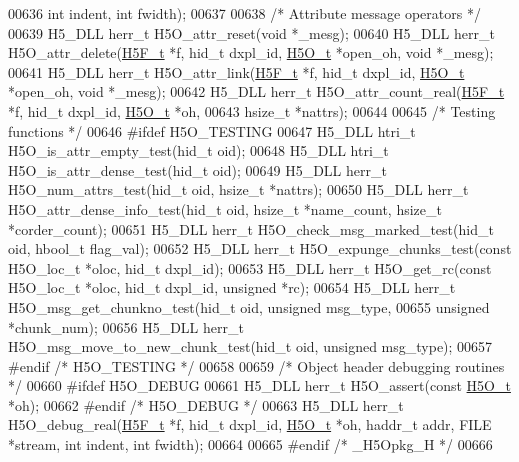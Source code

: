 \begin{DoxyCode}
00636     \textcolor{keywordtype}{int} indent, \textcolor{keywordtype}{int} fwidth);
00637 
00638 \textcolor{comment}{/* Attribute message operators */}
00639 H5\_DLL herr\_t H5O\_attr\_reset(\textcolor{keywordtype}{void} *\_mesg);
00640 H5\_DLL herr\_t H5O\_attr\_delete(\hyperlink{struct_h5_f__t}{H5F\_t} *f, hid\_t dxpl\_id, \hyperlink{struct_h5_o__t}{H5O\_t} *open\_oh, \textcolor{keywordtype}{void} *\_mesg);
00641 H5\_DLL herr\_t H5O\_attr\_link(\hyperlink{struct_h5_f__t}{H5F\_t} *f, hid\_t dxpl\_id, \hyperlink{struct_h5_o__t}{H5O\_t} *open\_oh, \textcolor{keywordtype}{void} *\_mesg);
00642 H5\_DLL herr\_t H5O\_attr\_count\_real(\hyperlink{struct_h5_f__t}{H5F\_t} *f, hid\_t dxpl\_id, \hyperlink{struct_h5_o__t}{H5O\_t} *oh,
00643     hsize\_t *nattrs);
00644 
00645 \textcolor{comment}{/* Testing functions */}
00646 \textcolor{preprocessor}{#ifdef H5O\_TESTING}
00647 H5\_DLL htri\_t H5O\_is\_attr\_empty\_test(hid\_t oid);
00648 H5\_DLL htri\_t H5O\_is\_attr\_dense\_test(hid\_t oid);
00649 H5\_DLL herr\_t H5O\_num\_attrs\_test(hid\_t oid, hsize\_t *nattrs);
00650 H5\_DLL herr\_t H5O\_attr\_dense\_info\_test(hid\_t oid, hsize\_t *name\_count, hsize\_t *corder\_count);
00651 H5\_DLL herr\_t H5O\_check\_msg\_marked\_test(hid\_t oid, hbool\_t flag\_val);
00652 H5\_DLL herr\_t H5O\_expunge\_chunks\_test(\textcolor{keyword}{const} H5O\_loc\_t *oloc, hid\_t dxpl\_id);
00653 H5\_DLL herr\_t H5O\_get\_rc(\textcolor{keyword}{const} H5O\_loc\_t *oloc, hid\_t dxpl\_id, \textcolor{keywordtype}{unsigned} *rc);
00654 H5\_DLL herr\_t H5O\_msg\_get\_chunkno\_test(hid\_t oid, \textcolor{keywordtype}{unsigned} msg\_type,
00655     \textcolor{keywordtype}{unsigned} *chunk\_num);
00656 H5\_DLL herr\_t H5O\_msg\_move\_to\_new\_chunk\_test(hid\_t oid, \textcolor{keywordtype}{unsigned} msg\_type);
00657 \textcolor{preprocessor}{#endif }\textcolor{comment}{/* H5O\_TESTING */}\textcolor{preprocessor}{}
00658 
00659 \textcolor{comment}{/* Object header debugging routines */}
00660 \textcolor{preprocessor}{#ifdef H5O\_DEBUG}
00661 H5\_DLL herr\_t H5O\_assert(\textcolor{keyword}{const} \hyperlink{struct_h5_o__t}{H5O\_t} *oh);
00662 \textcolor{preprocessor}{#endif }\textcolor{comment}{/* H5O\_DEBUG */}\textcolor{preprocessor}{}
00663 H5\_DLL herr\_t H5O\_debug\_real(\hyperlink{struct_h5_f__t}{H5F\_t} *f, hid\_t dxpl\_id, \hyperlink{struct_h5_o__t}{H5O\_t} *oh, haddr\_t addr, FILE *stream, \textcolor{keywordtype}{int} 
      indent, \textcolor{keywordtype}{int} fwidth);
00664 
00665 \textcolor{preprocessor}{#endif }\textcolor{comment}{/* \_H5Opkg\_H */}\textcolor{preprocessor}{}
00666 
\end{DoxyCode}
